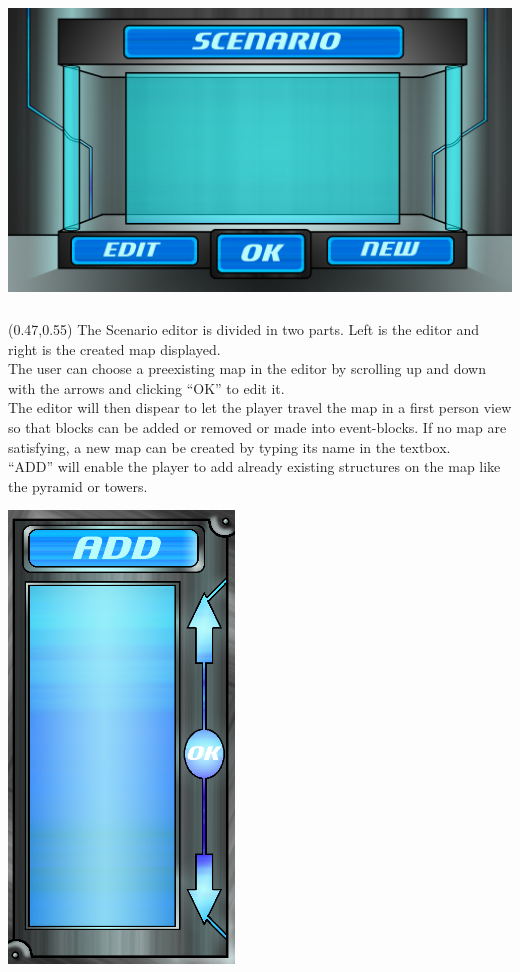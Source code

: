 \documentclass[article]{report}         %
\begin{document}
    \includegraphics[width=15cm, height=8cm]{images/Menus/Load_scenario_normal.png}


    \begin{textblock}{0.35}(0.47,0.55)
    The Scenario editor is divided in two parts. Left is the editor and right is the created map displayed. \\

The user can choose a preexisting map in the editor by scrolling up and down with the arrows and clicking ``OK'' to edit it.\\

 The editor will then dispear to let the player travel the map in a first person view so that blocks can be added or removed or made into event-blocks. If no map are satisfying, a new map can be created by typing its name in the textbox. \\

``ADD'' will enable the player to add already existing structures on the map like the pyramid or towers.\\
    \end{textblock}
    \includegraphics[width=6cm, height=12cm]{images/Menus/Scenario_editor_normal.png}
\end{document}
